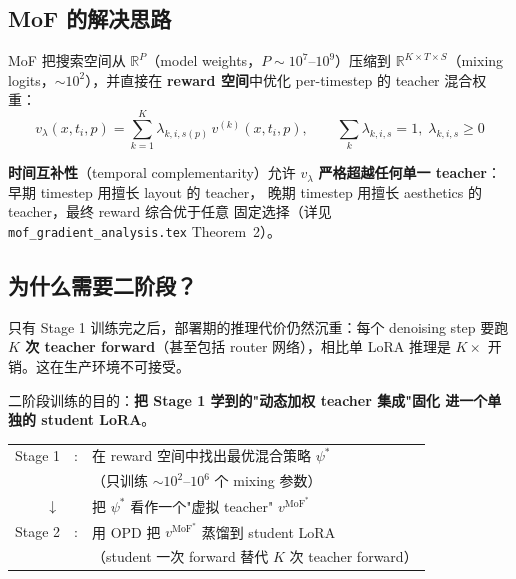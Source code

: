 \documentclass[11pt,a4paper]{article}
\newcommand{\R}{\mathbb{R}}
\newcommand{\MoF}{\mathrm{MoF}}
\theoremstyle{definition}
\begin{document}
\subsection{MoF 的解决思路}

MoF 把搜索空间从 $\R^P$（model weights，$P \sim 10^7$--$10^9$）压缩到
$\R^{K \times T \times S}$（mixing logits，$\sim 10^2$），并直接在
\textbf{reward 空间}中优化 per-timestep 的 teacher 混合权重：
\begin{equation}
v_\lambda(x, t_i, p) = \sum_{k=1}^K \lambda_{k,i,s(p)}\,v^{(k)}(x, t_i, p),
\qquad \sum_k \lambda_{k,i,s} = 1,\;\lambda_{k,i,s} \geq 0
\label{eq:mof_velocity_intro}
\end{equation}

\textbf{时间互补性}（temporal complementarity）允许 $v_\lambda$
\textbf{严格超越任何单一 teacher}：早期 timestep 用擅长 layout 的 teacher，
晚期 timestep 用擅长 aesthetics 的 teacher，最终 reward 综合优于任意
固定选择（详见 \texttt{mof\_gradient\_analysis.tex} Theorem~2）。

\subsection{为什么需要二阶段？}

只有 Stage 1 训练完之后，部署期的推理代价仍然沉重：每个 denoising step
要跑 \textbf{$K$ 次 teacher forward}（甚至包括 router 网络），相比单 LoRA
推理是 $K\times$ 开销。这在生产环境不可接受。

二阶段训练的目的：\textbf{把 Stage 1 学到的"动态加权 teacher 集成"固化
进一个单独的 student LoRA}。

\begin{tcolorbox}[colback=blue!5,colframe=blue!50!black,title=\textbf{二阶段流水线核心思想}]
\begin{center}
\renewcommand{\arraystretch}{1.4}
\begin{tabular}{rcl}
Stage 1 & : & 在 reward 空间中找出最优混合策略 $\psi^*$\\
        &   & \quad （只训练 $\sim 10^2$--$10^6$ 个 mixing 参数）\\[0.2em]
$\downarrow$ & & 把 $\psi^*$ 看作一个"虚拟 teacher" $v^{\MoF^*}$\\[0.2em]
Stage 2 & : & 用 OPD 把 $v^{\MoF^*}$ 蒸馏到 student LoRA\\
        &   & \quad （student 一次 forward 替代 $K$ 次 teacher forward）
\end{tabular}
\end{center}
\end{tcolorbox}
\end{document}
